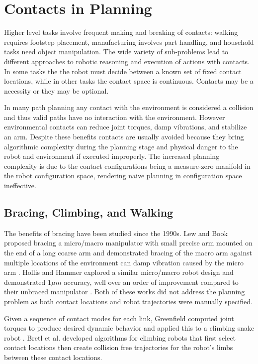 \documentclass[../thesis.tex]{subfiles}
\begin{document}
\section{Contacts in Planning}

Higher level tasks involve frequent making and breaking of contacts:
walking requires footstep placement, manufacturing involves part handling, and household tasks need object manipulation.
The wide variety of sub-problems lead to different approaches to robotic reasoning and execution of actions with contacts.
In some tasks the the robot must decide between a known set of fixed contact locations, while in other tasks the contact space is continuous.
Contacts may be a necessity or they may be optional.

In many path planning any contact with the environment is considered a collision and thus valid paths have no interaction with the environment.
However environmental contacts can reduce joint torques, damp vibrations, and stabilize an arm.
Despite these benefits contacts are usually avoided because they bring algorithmic complexity during the planning stage and physical danger to the robot and environment if executed improperly.
The increased planning complexity is due to the contact configurations being a measure-zero manifold in the robot configuration space, rendering naive planning in configuration space ineffective. 


\subsection{Bracing, Climbing, and Walking}
The benefits of bracing have been studied since the 1990s.
Lew and Book proposed bracing a micro/macro manipulator with small precise arm mounted on the end of a long coarse arm and demonstrated bracing of the macro arm against multiple locations of the environment can damp vibration caused by the micro arm \cite{Book1994} \cite{Lew1993}.
Hollis and Hammer explored a similar micro/macro robot design and demonstrated $1 \mu m$ accuracy, well over an order of improvement compared to their unbraced manipulator \cite{Hollis1992}.
Both of these works did not address the planning problem as both contact locations and robot trajectories were manually specified.


Given a sequence of contact modes for each link, Greenfield computed joint torques to produce desired dynamic behavior and applied this to a climbing snake robot \cite{Greenfield2005}.
Bretl et al. \cite{Bretl2006} developed algorithms for climbing robots that first select contact locations then create collision free trajectories for the robot's limbs between these contact locations.
\end{document}
